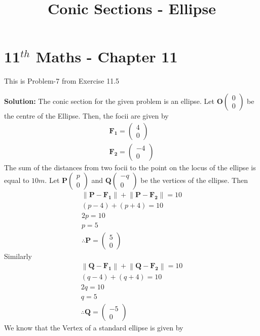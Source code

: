 \documentclass[12pt]{article}
\providecommand{\brak}[1]{\ensuremath{\left(#1\right)}}
\providecommand{\norm}[1]{\left\lVert#1\right\rVert}
\newcommand{\solution}{\noindent \textbf{Solution: }}
\newcommand{\myvec}[1]{\ensuremath{\begin{pmatrix}#1\end{pmatrix}}}
\let\vec\mathbf
\begin{document}
\begin{center}
\title{\textbf{Conic Sections - Ellipse}}
\date{\vspace{-5ex}} %
\maketitle
\end{center}
\setcounter{page}{1}

\section{11$^{th}$ Maths - Chapter 11}
This is Problem-7 from Exercise 11.5
\begin{enumerate}

\solution 
\fi
The conic section for the given problem is an ellipse. Let $\vec{O}\myvec{0 \\ 0}$ be the centre of the Ellipse. Then, the focii are given by 
\begin{align}
    \label{eq:chapters/11/11/5/7/ellipseEq1}
	\vec{F_1} = \myvec{ 4 \\ 0} \\
	\vec{F_2} = \myvec{ -4 \\ 0} 
\end{align}
The sum of the distances from two focii to the point on the locus of the ellipse is equal to $10m$. Let $\vec{P}\myvec{p \\ 0 }$ and $\vec{Q}\myvec{-q \\ 0}$ be the vertices of the ellipse. Then
\begin{align}
	\norm{\vec{P}-\vec{F_1}} + \norm{\vec{P}-\vec{F_2}} = 10 \\
         \brak{p-4} + \brak{p+4} = 10 \\
	 2p = 10 \\
	 p = 5  \\
	 \therefore \vec{P} = \myvec{5 \\ 0}
\end{align}
Similarly
\begin{align}
	\norm{\vec{Q}-\vec{F_1}} + \norm{\vec{Q}-\vec{F_2}} = 10 \\
         \brak{q-4} + \brak{q+4} = 10 \\
	 2q = 10 \\
	 q = 5 \\
	 \therefore \vec{Q} = \myvec{-5 \\ 0}
\end{align}
We know that the Vertex of a standard ellipse is given by

\end{enumerate}
\end{document}
